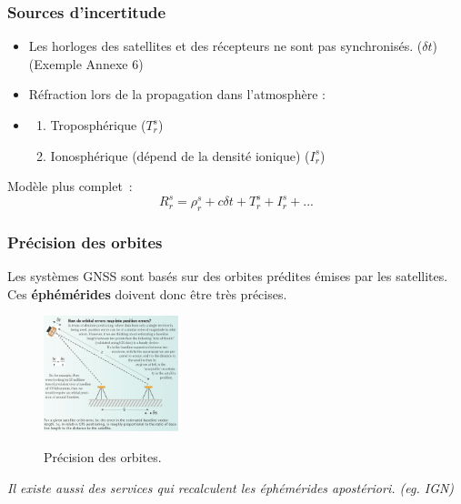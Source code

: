 \documentclass[xcolor=dvipsnames,envcountsect]{beamer}
\begin{document}
\begin{frame}
	\frametitle{Sources d'incertitude}
	\justifying
	\begin{itemize}
		\item Les horloges des satellites et des récepteurs ne sont pas synchronisés. ($\delta t$) {\tiny (Exemple Annexe 6)}
		\item Réfraction lors de la propagation dans l’atmosphère :
		\item \begin{enumerate}
			\item Troposphérique %
			 ($T_r^s$)
			\item Ionosphérique (dépend de la densité ionique)
			 ($I_r^s$)
		\end{enumerate}
	\end{itemize}
	Modèle plus complet :
	\begin{equation}
		\boxed{R_r^s = \rho_r^s + c\delta t + T_r^s + I_r^s + ...}
	\end{equation}
\end{frame}
\begin{frame}
	\frametitle{Précision des orbites}
	\justifying
	Les systèmes GNSS sont basés sur des orbites prédites émises par les satellites. \\
	Ces \textbf{éphémérides} doivent donc être très précises. 
	\begin{figure}
		\centering
		\includegraphics[width=0.35\textwidth]{./Figures/ENS_gnss2.png} \\
		\caption {Précision des orbites. \cite{ens}}
	\end{figure}
	{\small	\textit{Il existe aussi des services qui recalculent les éphémérides apostériori. (eg. IGN)}}
\end{frame}
\end{document}
